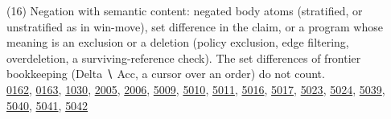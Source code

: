 \documentclass[10pt]{article}
\begin{document}
\begin{description}[leftmargin=1.2em,itemsep=2pt]
\item[\texttt{negation}\label{tag:negation}] (16) Negation with semantic content: negated body atoms (stratified, or unstratified as in win-move), set difference in the claim, or a program whose meaning is an exclusion or a deletion (policy exclusion, edge filtering, overdeletion, a surviving-reference check). The set differences of frontier bookkeeping (Delta ∖ Acc, a cursor over an order) do not count.\\ {\small \hyperref[case:Example0162]{0162}, \hyperref[case:Example0163]{0163}, \hyperref[case:Example1030]{1030}, \hyperref[case:Example2005]{2005}, \hyperref[case:Example2006]{2006}, \hyperref[case:Example5009]{5009}, \hyperref[case:Example5010]{5010}, \hyperref[case:Example5011]{5011}, \hyperref[case:Example5016]{5016}, \hyperref[case:Example5017]{5017}, \hyperref[case:Example5023]{5023}, \hyperref[case:Example5024]{5024}, \hyperref[case:Example5039]{5039}, \hyperref[case:Example5040]{5040}, \hyperref[case:Example5041]{5041}, \hyperref[case:Example5042]{5042}}
\end{description}
\end{document}
